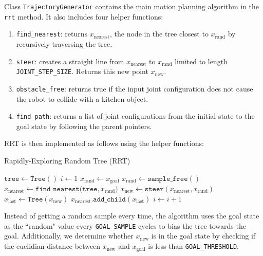 \documentclass{article}
\begin{document}
Class \texttt{TrajectoryGenerator} contains the main motion planning algorithm in the \texttt{rrt} method. It also includes four helper functions:
\begin{enumerate}
    \item \texttt{find\_nearest}: returns $x_\text{nearest}$, the node in the tree closest to $x_\text{rand}$ by recursively traversing the tree.
    \item \texttt{steer}: creates a straight line from $x_\text{nearest}$ to $x_\text{rand}$ limited to length \texttt{JOINT\_STEP\_SIZE}. Returns this new point $x_\text{new}$.
    \item \texttt{obstacle\_free}: returns true if the input joint configuration does not cause the robot to collide with a kitchen object.
    \item \texttt{find\_path}: returns a list of joint configurations from the initial state to the goal state by following the parent pointers.
\end{enumerate}

RRT is then implemented as follows using the helper functions:
\begin{algorithm}
\caption{Rapidly-Exploring Random Tree (RRT)}\label{alg:rrt}
\begin{algorithmic}
\State $\mathtt{tree} \gets \mathtt{Tree()}$
\State $i \gets 1$
        \State $x_\text{rand} \gets x_\text{goal}$
    \Else
        \State $x_\text{rand} \gets \mathtt{sample\_free()}$
    \EndIf
    \State $x_\text{nearest} \gets \mathtt{find\_nearest(tree}, x_\text{rand})$
    \State $x_\text{new} \gets \mathtt{steer}(x_\text{nearest}, x_\text{rand})$
    \State $x_\text{last} \gets \mathtt{Tree}(x_\text{new})$
        \State $x_\text{nearest}\mathtt{.add\_child}(x_\text{last})$
            \State {}
        \EndIf 
        \State $i \gets i + 1$
    \EndIf 
\EndWhile
\end{algorithmic}
\end{algorithm}

Instead of getting a random sample every time, the algorithm uses the goal state as the ``random" value every \texttt{GOAL\_SAMPLE} cycles to bias the tree towards the goal. Additionally, we determine whether $x_\text{new}$ is in the goal state by checking if the euclidian distance between $x_\text{new}$ and $x_\text{goal}$ is less than \texttt{GOAL\_THRESHOLD}. 
\end{document}
